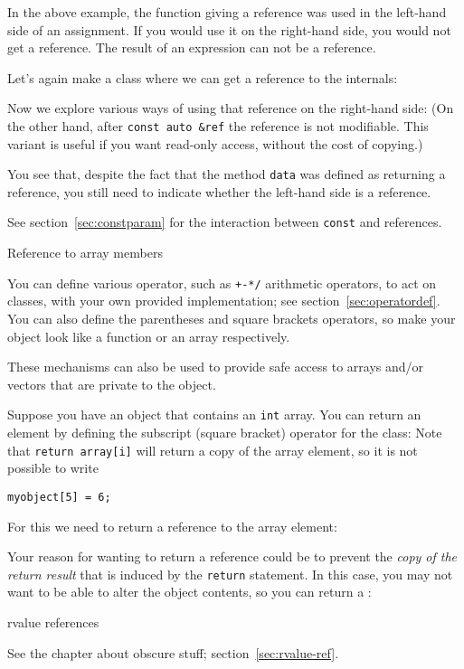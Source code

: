 In the above example, the function giving a reference was used in the left-hand side of
an assignment. If you would use it on the right-hand side, you would
not get a reference. The result of an expression can not be a
reference.

Let's again make a class where we can get a reference to the
internals:
%

Now we explore various ways of using that reference on the right-hand
side:
%
%
(On the other hand, after \lstinline+const auto &ref+ the reference is not
modifiable. This variant is useful if you want read-only access,
without the cost of copying.)

You see that, despite the fact that the method \lstinline{data} was defined as
returning a reference, you still need to indicate whether the
left-hand side is a reference.

See section~\ref{sec:constparam} for the interaction between \lstinline{const}
and references.

 {Reference to array members}
\label{sec:overloadbracket}

You can define various operator, such as \verb.+-*/. arithmetic
operators, to act on classes, with your own provided implementation;
see section~\ref{sec:operatordef}. You can also define the parentheses
and square brackets operators, so make your object look like a
function or an array respectively.

These mechanisms can also be used to provide safe access to arrays
and/or vectors that are private to the object.

Suppose you have an object that contains an \lstinline{int} array. You can
return an element by defining the subscript (square bracket) operator
for the class:
%
%
Note that \lstinline+return array[i]+ will return a copy of the array element,
so it is not possible to write
\begin{lstlisting}
myobject[5] = 6;
\end{lstlisting}
For this we need to return a reference to the array element:
%

Your reason for wanting to return a reference could be to prevent the
\emph{copy of the return result}
that is induced by the \lstinline{return} statement.
In this case, you may not want to be able to alter the object
contents, so you can return a :
%

 {rvalue references}

See the chapter about obscure stuff; section~\ref{sec:rvalue-ref}.
